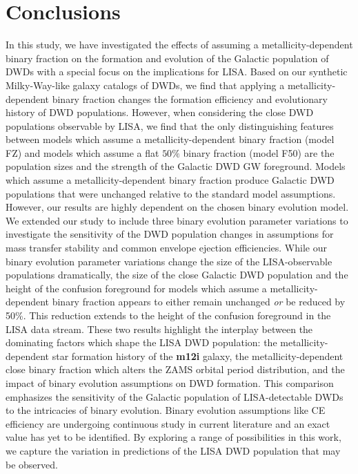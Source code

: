 \documentclass[twocolumn, linenumbers]{aastex631}
\begin{document}
\section{Conclusions}\label{sec:conclusions}
In this study, we have investigated the effects of assuming a 
metallicity-dependent binary fraction on the formation and evolution of 
the Galactic population of DWDs with a special focus on the implications 
for LISA. Based on our synthetic Milky-Way-like galaxy catalogs of DWDs, 
we find that applying a metallicity-dependent binary fraction changes the 
formation efficiency and evolutionary history of DWD populations. However, 
when considering the close DWD populations observable by LISA, we find 
that the only distinguishing features between models which assume a 
metallicity-dependent binary fraction (model FZ) and models which assume a 
flat $50\%$ binary fraction (model F50) are the population sizes and the 
strength of the Galactic DWD GW foreground. Models which assume a 
metallicity-dependent binary fraction produce Galactic DWD populations 
that were unchanged relative to the standard model assumptions. However, 
our results are highly dependent on the chosen binary evolution model. We 
extended our study to include three binary evolution parameter variations 
to investigate the sensitivity of the DWD population changes in 
assumptions for mass transfer stability and common envelope ejection 
efficiencies. While our binary evolution parameter variations change the 
size of the LISA-observable populations dramatically, the size of the 
close Galactic DWD population and the height of the confusion foreground 
for models which assume a metallicity-dependent binary fraction appears to 
either remain unchanged \emph{or} be reduced by 50\%. This reduction 
extends to the height of the confusion foreground in the LISA data stream. 
These two results highlight the interplay between the dominating factors 
which shape the LISA DWD population: the metallicity-dependent star 
formation history of the \textbf{m12i} galaxy, the metallicity-dependent 
close binary fraction which alters the ZAMS orbital period distribution, 
and the impact of binary evolution assumptions on DWD formation. This 
comparison emphasizes the sensitivity of the Galactic population of 
LISA-detectable DWDs to the intricacies of binary evolution. Binary 
evolution assumptions like CE efficiency are undergoing continuous study 
in current literature and an exact value has yet to be identified. By 
exploring a range of possibilities in this work, we capture the variation 
in predictions of the LISA DWD population that may be observed.
\end{document}
